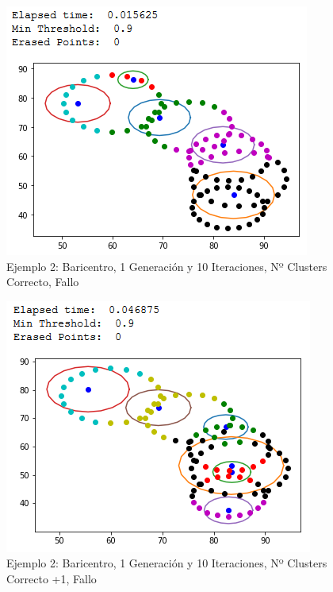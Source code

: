 \documentclass[conference,a4paper]{IEEEtran}
\begin{document}
\begin{figure}[H]
\centering
\includegraphics[scale=0.65]{Experimentacion/Ejemplo2/ej2_b_1_10_cc_wrong}
\caption{Ejemplo 2: Baricentro, 1 Generación y 10 Iteraciones,  Nº Clusters Correcto, Fallo\\}
\end{figure}

\begin{figure}[H]
\centering
\includegraphics[scale=0.65]{Experimentacion/Ejemplo2/ej2_b_1_10_mc_wrong}
\caption{Ejemplo 2: Baricentro, 1 Generación y 10 Iteraciones,  Nº Clusters Correcto +1, Fallo\\}
\end{figure}
\end{document}
